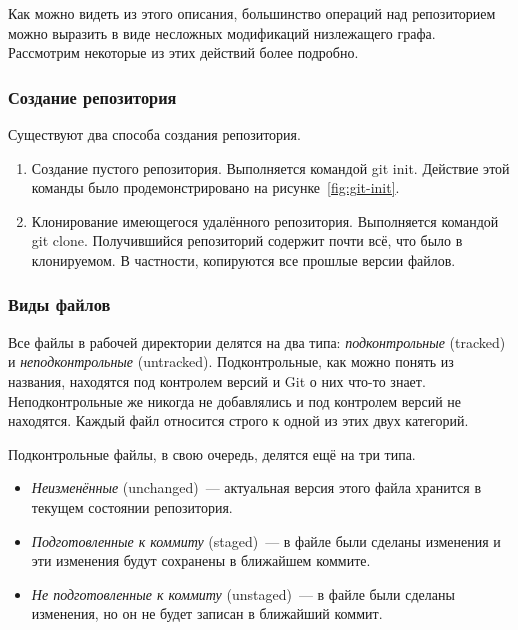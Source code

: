 Как можно видеть из этого описания, большинство операций над
репозиторием можно выразить в виде несложных модификаций низлежащего
графа. Рассмотрим некоторые из этих действий более подробно.

\subsubsection{Создание репозитория}

Существуют два способа создания репозитория.

\begin{enumerate}
\item Создание пустого репозитория. Выполняется командой git init.
  Действие этой команды было продемонстрировано на
  рисунке~\ref{fig:git-init}.
\item Клонирование имеющегося удалённого репозитория. Выполняется
  командой git clone. Получившийся репозиторий содержит почти всё, что
  было в клонируемом. В частности, копируются все прошлые версии
  файлов.
\end{enumerate}

\subsubsection{Виды файлов}

Все файлы в рабочей директории делятся на два типа:
\emph{подконтрольные} (tracked) и \emph{неподконтрольные} (untracked).
Подконтрольные, как можно понять из названия, находятся под контролем
версий и Git о них что-то знает. Неподконтрольные же никогда не
добавлялись и под контролем версий не находятся. Каждый файл относится
строго к одной из этих двух категорий.

Подконтрольные файлы, в свою очередь, делятся ещё на три типа.

\begin{itemize}
\item \emph{Неизменённые} (unchanged)~--- актуальная версия этого
  файла хранится в текущем состоянии репозитория.
\item \emph{Подготовленные к коммиту} (staged)~--- в файле были
  сделаны изменения и эти изменения будут сохранены в ближайшем коммите.
\item \emph{Не подготовленные к коммиту} (unstaged)~--- в файле были
  сделаны изменения, но он не будет записан в ближайший коммит.
\end{itemize}

